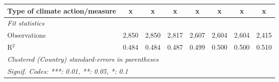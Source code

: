\begin{table}[htbp]
\begin{tabular}{lccccccc}
      Type of climate action/measure                                  & x              & x              & x              & x             & x             & x             & x\\  
      \midrule \emph{Fit statistics}\\
      Observations                                                    & 2,850          & 2,850          & 2,817          & 2,607         & 2,604         & 2,604         & 2,415\\  
      R$^2$                                                           & 0.484          & 0.484          & 0.487          & 0.499         & 0.500         & 0.500         & 0.510\\  
      \midrule
      \multicolumn{8}{l}{\emph{Clustered (Country) standard-errors in parentheses}}\\
      \multicolumn{8}{l}{\emph{Signif. Codes: ***: 0.01, **: 0.05, *: 0.1}}\\
   \end{tabular}
\end{table}


